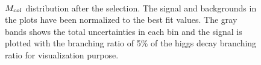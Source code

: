\begin{figure}[htbp] 
     \centering
     \\
     \caption{$M_{col}$ distribution after the selection. The signal and backgrounds in the plots have been normalized to the best fit values. The gray bands shows the total uncertainties in each bin and the signal is plotted with the branching ratio of 5\% of the higgs decay branching ratio for visualization purpose.}
     \label{fig:cutbasedpostfit}
\end{figure}



